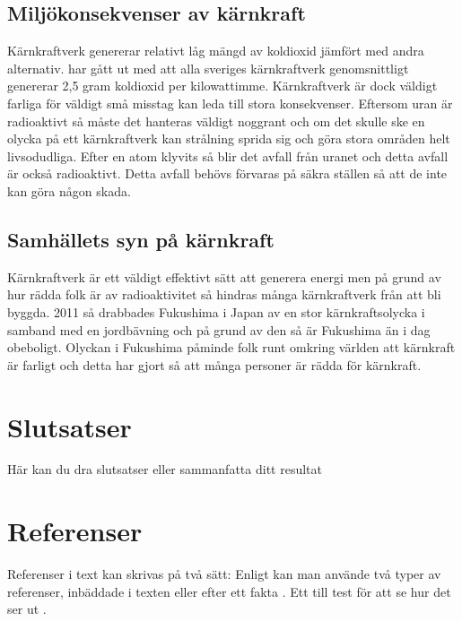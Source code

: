 \documentclass[11p]{article}
\begin{document}
    \subsection{Miljökonsekvenser av kärnkraft}
    Kärnkraftverk genererar relativt låg mängd av koldioxid jämfört med andra alternativ.
    \textciteeVATTENFALL har gått ut med att alla sveriges kärnkraftverk genomsnittligt genererar 2,5 gram koldioxid per kilowattimme.
    Kärnkraftverk är dock väldigt farliga för väldigt små misstag kan leda till stora konsekvenser.
    Eftersom uran är radioaktivt så måste det hanteras väldigt noggrant och om det skulle ske en olycka på ett kärnkraftverk kan strålning sprida sig och göra stora områden helt livsodudliga.
    Efter en atom klyvits så blir det avfall från uranet och detta avfall är också radioaktivt.
    Detta avfall behövs förvaras på säkra ställen så att de inte kan göra någon skada.

    \subsection{Samhällets syn på kärnkraft}
    Kärnkraftverk är ett väldigt effektivt sätt att generera energi men på grund av hur rädda folk är av radioaktivitet så hindras många kärnkraftverk från att bli byggda.
    2011 så drabbades Fukushima i Japan av en stor kärnkraftsolycka i samband med en jordbävning och på grund av den så är Fukushima än i dag obeboligt.
    Olyckan i Fukushima påminde folk runt omkring världen att kärnkraft är farligt och detta har gjort så att många personer är rädda för kärnkraft.
    \subsection{}

    \section{Slutsatser}
    Här kan du dra slutsatser eller sammanfatta ditt resultat


    \section{Referenser}
    Referenser i text kan skrivas på två sätt: Enligt \textcite{Jens} kan man använde två typer av referenser, inbäddade i texten eller efter ett fakta \parencite{Fraenkel}. Ett till test för att se hur det ser ut \parencite[sid 55]{fermi}.
\end{document}
